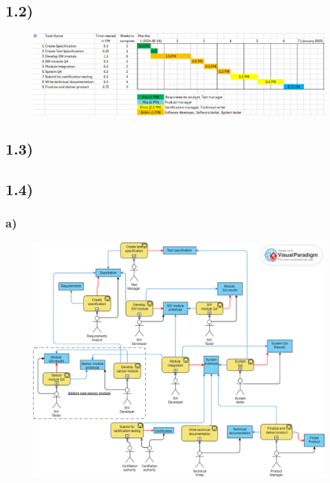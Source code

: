 \documentclass[a4paper]{scrartcl}
\begin{document}
\newpage

\subsection*{1.2)}
\begin{figure}[h]
  \centering
  \includegraphics[width=1\textwidth]{1.2_Gantt_Chart.PNG} %
  \caption{}
\end{figure}

\subsection*{1.3)}

\newpage

\subsection*{1.4)}
\subsubsection*{a)}
\begin{figure}[h]
  \centering
  \includegraphics[width=1\textwidth]{1.4_GPM_extended.png} %
  \caption{}
\end{figure}
\end{document}

